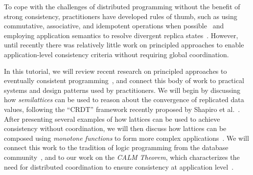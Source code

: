 To cope with the challenges of distributed programming without the benefit of
strong consistency, practitioners have developed rules of thumb, such as using
commutative, associative, and idempotent operations when
possible~\cite{Helland2009,Pritchett2008} and employing application semantics to
resolve divergent replica states~\cite{DeCandia2007}. However, until recently
there was relatively little work on principled approaches to enable
application-level consistency criteria without requiring global coordination.

In this tutorial, we will review recent research on principled approaches to
eventually consistent
programming~\cite{Alvaro2011,Burckhardt2012,Conway2012,Hellerstein2010,Roh2011,Shapiro2011a,Shapiro2011b},
and connect this body of work to practical systems and design patterns used by
practitioners. We will begin by discussing how \emph{semilattices} can be used to
reason about the convergence of replicated data values, following the ``CRDT''
framework recently proposed by Shapiro et
al.~\cite{Shapiro2011a,Shapiro2011b}. After presenting several examples of how
lattices can be used to achieve consistency without coordination, we will then
discuss how lattices can be composed using \emph{monotone functions} to form
more complex applications~\cite{Conway2012}. We will connect this work to the tradition of logic programming from the database community~\cite{AliceBook}, and to our work on the
\emph{CALM Theorem}, which characterizes the need for distributed coordination to 
ensure consistency at application level~\cite{Alvaro2011,Ameloot2011,Hellerstein2010,dedalus-confluence}. 

\begin{comment}
Finally,
we will discuss several design options for supporting non-monotonic operations:
\begin{compactenum}[(a)]
\item introducing coordination at appropriate program locations identified by
  CALM analysis
\item employing ``weak coordination'' as a background operation (e.g., for distributed
garbage collection)
\item tolerating and then correcting inconsistency using taint tracking and
after-the-fact ``apology'' or compensation logic~\cite{Garcia-Molina1987,Helland2009,Korth1990}
\end{compactenum}
We will conclude by summarizing the state of the art and highlighting open
problems and challenges in the field.
\end{comment}

